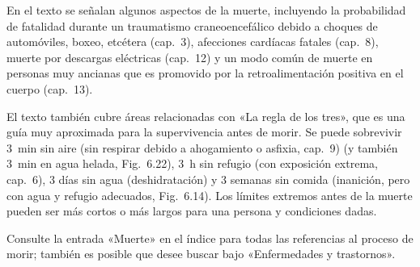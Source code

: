 \documentclass[12pt,a4paper]{book}
\begin{document}
En el texto se señalan algunos aspectos de la muerte, incluyendo la probabilidad de fatalidad durante un traumatismo craneoencefálico debido a choques de automóviles, boxeo, etcétera (cap.~3), afecciones cardíacas fatales (cap.~8), muerte por descargas eléctricas (cap.~12) y un modo común de muerte en personas muy ancianas que es promovido por la retroalimentación positiva en el cuerpo (cap.~13).

El texto también cubre áreas relacionadas con «La regla de los tres», que es una guía muy aproximada para la supervivencia antes de morir. Se puede sobrevivir 3~min sin aire (sin respirar debido a ahogamiento o asfixia, cap.~9) (y también 3~min en agua helada, Fig.~6.22), 3~h sin refugio (con exposición extrema, cap.~6), 3 días sin agua (deshidratación) y 3 semanas sin comida (inanición, pero con agua y refugio adecuados, Fig.~6.14). Los límites extremos antes de la muerte pueden ser más cortos o más largos para una persona y condiciones dadas.

Consulte la entrada «Muerte» en el índice para todas las referencias al proceso de morir; también es posible que desee buscar bajo «Enfermedades y trastornos».
\end{document}
